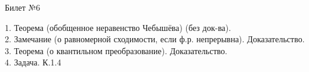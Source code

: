\documentclass[preview]{standalone}
\begin{document}
 
\begin{center} {\Large Билет №6} \end{center} 

1.  Теорема (обобщенное неравенство Чебышёва) (без док-ва).\\

2.  Замечание (о равномерной сходимости, если ф.р. непрерывна). Доказательство.\\

3.  Теорема (о квантильном преобразование). Доказательство.\\

4. Задача. К.1.4\\
\end{document}
